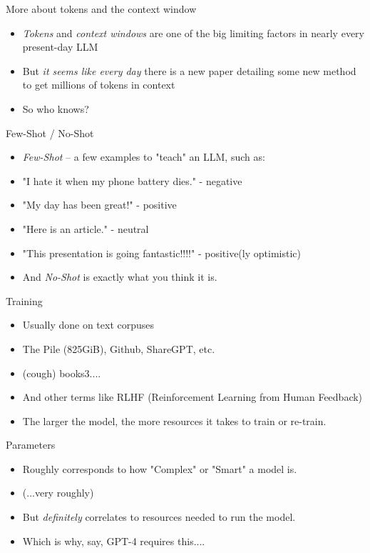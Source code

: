 \documentclass{beamer}
\begin{document}
\begin{frame}{More about tokens and the context window}
	\begin{itemize}
		\item \textit{Tokens} and \textit{context windows} are one of the big limiting factors in nearly every present-day LLM
		\pause
		\item But \textit{it seems like every day} there is a new paper detailing some new method to get millions of tokens in context
		\pause
		\item So who knows?
	\end{itemize}
	
\end{frame}

\begin{frame}{Few-Shot / No-Shot}
	\begin{itemize}
		\item \textit{Few-Shot} -- a few examples to "teach" an LLM, such as:
		\pause
		\item "I hate it when my phone battery dies." - negative
		\pause
		\item "My day has been great!" - positive
		\pause
		\item "Here is an article." - neutral
		\pause
		\item "This presentation is going fantastic!!!!" - positive(ly optimistic)
		\pause
		\item And \textit{No-Shot} is exactly what you think it is.
	\end{itemize}
\end{frame}

\begin{frame}{Training}
	\begin{itemize}
		\item Usually done on text corpuses
		\pause
		\item The Pile (825GiB), Github, ShareGPT, etc.
		\pause
		\item (cough) books3....
		\pause
		\item And other terms like RLHF (Reinforcement Learning from Human Feedback)
		\pause
		\item The larger the model, the more resources it takes to train or re-train.
	\end{itemize}
\end{frame}

\begin{frame}{Parameters}
	\begin{itemize}
		\item Roughly corresponds to how "Complex" or "Smart" a model is.
		\pause
		\item (...very roughly)
		\pause 
		\item But \textit{definitely} correlates to resources needed to run the model.
		\pause
		\item Which is why, say, GPT-4 requires this....
	\end{itemize}
\end{frame}
\end{document}
